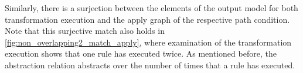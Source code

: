 %
%

Similarly, there is a surjection between the elements of the output model for both transformation execution and the apply graph of the respective path condition. Note that this surjective match also holds in \cref{fig:non_overlapping2_match_apply}, where examination of the transformation execution shows that one rule has executed twice. As mentioned before, the abstraction relation abstracts over the number of times that a rule has executed.

